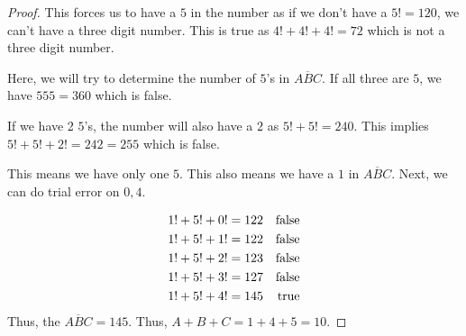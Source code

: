 \begin{proof}
    This forces us to have a $5$ in the number as if we don't have a $5!=120$, we can't have a three 
    digit number. This is true as $4!+4!+4!=72$ which is not a three digit number.\par
    Here, we will try to determine the number of $5$'s in $\overline{ABC}$. If all three are $5$, 
    we have $555=360$ which is false.\par
    If we have 2 $5$'s, the number will also have a $2$ as $5!+5!=240$. This implies $5!+5!+2!=242=255$ 
    which is false.\par
    This means we have only one $5$. This also means we have a $1$ in $\overline{ABC}$. Next, we 
    can do trial error on $0,4$.\par
    \begin{align*}
        1!+5!+0! & = 122 & \operatorname{false} \\
        1!+5!+1! & = 122 & \operatorname{false} \\
        1!+5!+2! & = 123 & \operatorname{false} \\
        1!+5!+3! & = 127 & \operatorname{false} \\
        1!+5!+4! & = 145 & \operatorname{true} \\
    \end{align*}
    Thus, the $\overline{ABC}=145$. Thus, $A+B+C=1+4+5=10$.
\end{proof}
